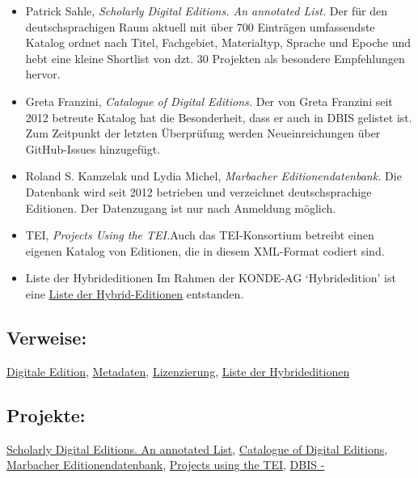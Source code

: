 \documentclass{article}
\begin{document}
        \begin{itemize}\item {Patrick Sahle, \emph{Scholarly Digital Editions. An annotated
                        List.} Der für den deutschsprachigen Raum aktuell mit über 700 Einträgen
                        umfassendste Katalog ordnet nach Titel, Fachgebiet, Materialtyp, Sprache und
                        Epoche und hebt eine kleine Shortlist von dzt. 30 Projekten als besondere
                        Empfehlungen hervor.
                     }\item {Greta Franzini, \emph{Catalogue of Digital Editions.}
                        Der von Greta Franzini seit 2012 betreute Katalog hat die Besonderheit, dass er
                        auch in DBIS gelistet ist. Zum Zeitpunkt der letzten Überprüfung werden
                        Neueinreichungen über GitHub-Issues hinzugefügt. }\item {Roland S. Kamzelak und Lydia Michel, \emph{Marbacher Editionendatenbank.} Die Datenbank wird seit 2012
                        betrieben und verzeichnet deutschsprachige Editionen. Der Datenzugang ist nur
                        nach Anmeldung möglich.}\item { TEI, \emph{Projects Using the TEI.}Auch das
                        TEI-Konsortium betreibt einen eigenen Katalog von Editionen, die in diesem
                        XML-Format codiert sind. }\item {Liste der Hybrideditionen Im Rahmen der KONDE-AG ‘Hybridedition’ ist
                        eine \href{http://gams.uni-graz.at/o:konde.117}{Liste der
                           Hybrid-Editionen} entstanden.}\end{itemize}\subsection*{Verweise:}\href{https://gams.uni-graz.at/o:konde.59}{Digitale Edition}, \href{https://gams.uni-graz.at/o:konde.25}{Metadaten}, \href{https://gams.uni-graz.at/o:konde.119}{Lizenzierung}, \href{https://gams.uni-graz.at/o:konde.117}{Liste der Hybrideditionen}\subsection*{Projekte:}\href{http://digitale-edition.de/}{Scholarly Digital
                              Editions. An annotated
                              List}, \href{https://dig-ed-cat.acdh.oeaw.ac.at/}{Catalogue
                              of Digital Editions}, \href{https://www.dla-marbach.de/digital-humanities/editionen-db/}{Marbacher Editionendatenbank}, \href{https://tei-c.org/activities/projects/}{Projects using the TEI}, \href{http://dbis.uni-regensburg.de/}{DBIS -
}
\end{document}
